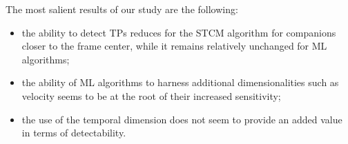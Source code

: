\documentclass{aa}
\begin{document}

The most salient results of our study are the following:
\begin{itemize}
    \item the ability to detect TPs reduces for the STCM algorithm for companions closer to the frame center, while it remains relatively unchanged for ML algorithms;
    \item the ability of ML algorithms to harness additional dimensionalities such as velocity seems to be at the root of their increased sensitivity;
    \item the use of the temporal dimension does not seem to provide an added value in terms of detectability.%
\end{itemize}
\end{document}
